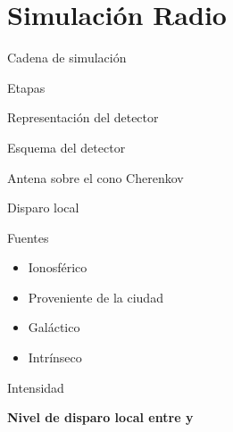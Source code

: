 \section[Simulaci\'on]{Simulaci\'on Radio}



\begin{frame}{Cadena de simulaci\'on}
\footnotesize
	\begin{block}{Etapas}
		\begin{center}
		\end{center}
	\end{block}
\end{frame}



\begin{frame}{Representaci\'on del detector}
\footnotesize
	\begin{block}{Esquema del detector}
		\begin{center}
		\end{center}
	\end{block}
	\begin{alertblock}{Antena sobre el cono Cherenkov}
	\begin{center}
		\hspace*{2mm}
	\end{center}
	\end{alertblock}
\end{frame}

\begin{frame}{Disparo local}
\footnotesize
	\begin{exampleblock}{Fuentes}
	\begin{itemize}
	 \item Ionosf\'erico
	 \item Proveniente de la ciudad
	 \item Gal\'actico
	 \item Intr\'inseco
	\end{itemize}
	\end{exampleblock}
	\begin{block}{Intensidad}
		\begin{center}
		\end{center}
	\end{block}
	\vspace*{-1cm}
	\begin{alertblock}{}
		\begin{center}
		\textbf{Nivel de disparo local entre  y }
		\end{center}
	\end{alertblock}
\end{frame}
